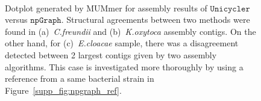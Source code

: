 \documentclass[10pt,twocolumn,twoside]{genpaper}
\newcommand{\npgraph}{$\mathtt{npGraph}$}
\newcommand{\unicycler}{$\mathtt{Unicycler}$}
\begin{document}
\begin{figure}[!hpt]
\centering
{}
\hfill
{}
\\
\caption[Dotplot generated by MUMmer for assembly results of \unicycler{} versus \npgraph{}.]{Dotplot generated by MUMmer for assembly results of \unicycler{} versus \npgraph{}. Structural agreements between two methods were found in (a)~\emph{C.freundii} and (b)~\emph{K.oxytoca} assembly contigs. On the other hand, for (c)~\emph{E.cloacae} sample, there was a disagreement detected between 2 largest contigs given by two assembly algorithms. This case is investigated more thoroughly by using a reference from a same bacterial strain in Figure~\ref{supp_fig:npgraph_ref}.}
\label{supp_fig:npgraph_dotplot}
\end{figure}
\end{document}
